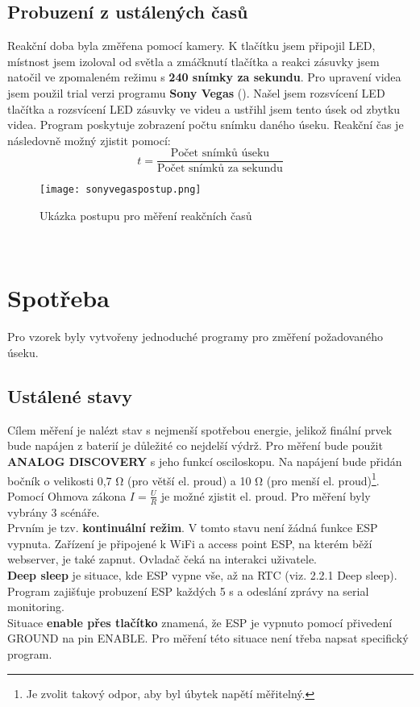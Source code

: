 \documentclass[a4paper, 12pt]{report}
\begin{document}
			\subsection{Probuzení z ustálených časů}
				Reakční doba byla změřena pomocí kamery. K tlačítku jsem připojil LED, místnost jsem izoloval od světla a zmáčknutí tlačítka a reakci zásuvky jsem natočil ve zpomaleném režimu s {\bf 240 snímky za sekundu}. Pro upravení videa jsem použil trial verzi programu {\bf Sony Vegas} (). Našel jsem rozsvícení LED tlačítka a rozsvícení LED zásuvky ve videu a ustřihl jsem tento úsek od zbytku videa. Program poskytuje zobrazení počtu snímku daného úseku. Reakční čas je následovně možný zjistit pomocí:
				$$ t = \frac{\textrm{Počet snímků úseku}}{\textrm{Počet snímků za sekundu}}$$
				\begin{figure}[h]
					\centering
					\texttt{[image: sonyvegaspostup.png]}
					\caption{Ukázka postupu pro měření reakčních časů}
					\label{sonyvegaspostup}
				\end{figure}
				\
			\section{Spotřeba}
				Pro vzorek byly vytvořeny jednoduché programy pro změření požadovaného úseku.
				\subsection{Ustálené stavy}
					Cílem měření je nalézt stav s nejmenší spotřebou energie, jelikož finální prvek bude napájen z baterií je důležité co nejdelší výdrž. Pro měření bude použit {\bf ANALOG DISCOVERY} s jeho funkcí osciloskopu. Na napájení bude přidán bočník o velikosti 0,7 \si{\ohm} (pro větší el. proud) a 10 \si{\ohm} (pro menší el. proud)\footnote{Je zvolit takový odpor, aby byl úbytek napětí měřitelný.}. Pomocí Ohmova zákona $ I = \frac{U}{R} $ je možné zjistit el. proud. Pro měření byly vybrány 3 scénáře.\\
					Prvním je tzv. {\bf kontinuální režim}. V tomto stavu není žádná funkce ESP vypnuta. Zařízení je připojené k WiFi a access point ESP, na kterém běží webserver, je také zapnut. Ovladač čeká na interakci uživatele.\\
					{\bf Deep sleep} je situace, kde ESP vypne vše, až na RTC (viz. 2.2.1 Deep sleep). Program zajišťuje probuzení ESP každých 5 \si{s} a odeslání zprávy na serial monitoring.\\
					Situace {\bf enable přes tlačítko} znamená, že ESP je vypnuto pomocí přivedení GROUND na pin ENABLE. Pro měření této situace není třeba napsat specifický program.
\end{document}
